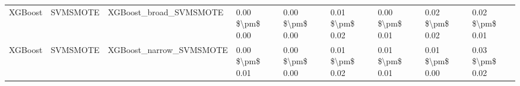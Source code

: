 \begin{tabular}{lllllllll}
                        XGBoost &                      SVMSMOTE &                       XGBoost\_broad\_SVMSMOTE & 0.00 \$\textbackslash pm\$ 0.00 &           0.00 \$\textbackslash pm\$ 0.00 &       0.01 \$\textbackslash pm\$ 0.02 &        0.00 \$\textbackslash pm\$ 0.01 &                         0.02 \$\textbackslash pm\$ 0.02 &     0.02 \$\textbackslash pm\$ 0.01 \\
                        XGBoost &                      SVMSMOTE &                      XGBoost\_narrow\_SVMSMOTE & 0.00 \$\textbackslash pm\$ 0.01 &           0.00 \$\textbackslash pm\$ 0.00 &       0.01 \$\textbackslash pm\$ 0.02 &        0.01 \$\textbackslash pm\$ 0.01 &                         0.01 \$\textbackslash pm\$ 0.00 &     0.03 \$\textbackslash pm\$ 0.02 \\
\bottomrule
\end{tabular}
